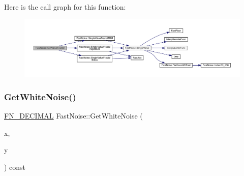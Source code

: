 Here is the call graph for this function\+:
\nopagebreak
\begin{figure}[H]
\begin{center}
\leavevmode
\includegraphics[width=350pt]{class_fast_noise_a972ef8f462048015489604783155fd17_cgraph}
\end{center}
\end{figure}
\mbox{\label{class_fast_noise_aaf5a3c39b9e95d064690711852fb7fbf}} 
\subsubsection{\texorpdfstring{Get\+White\+Noise()}{GetWhiteNoise()}\hspace{0.1cm}{\footnotesize\ttfamily [1/3]}}
{\footnotesize\ttfamily \mbox{\hyperlink{_fast_noise_8h_a75a9ef6d2541c4921815b885bfd449c3}{F\+N\+\_\+\+D\+E\+C\+I\+M\+AL}} Fast\+Noise\+::\+Get\+White\+Noise (\begin{DoxyParamCaption}\item[{\mbox{\hyperlink{_fast_noise_8h_a75a9ef6d2541c4921815b885bfd449c3}{F\+N\+\_\+\+D\+E\+C\+I\+M\+AL}}}]{x,  }\item[{\mbox{\hyperlink{_fast_noise_8h_a75a9ef6d2541c4921815b885bfd449c3}{F\+N\+\_\+\+D\+E\+C\+I\+M\+AL}}}]{y }\end{DoxyParamCaption}) const}

